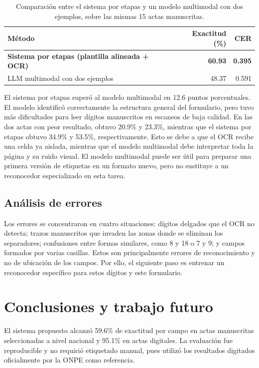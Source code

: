 \documentclass[conference]{IEEEtran}
\begin{document}
\begin{table}[t]
\caption{Comparaci\'on entre el sistema por etapas y un modelo multimodal con
dos ejemplos, sobre las mismas 15 actas manuscritas.}
\label{tab:llm}
\centering
\begin{tabular}{lrr}
\toprule
M\'etodo & Exactitud (\%) & CER \\
\midrule
\textbf{Sistema por etapas (plantilla alineada + OCR)} & \textbf{60.93} & \textbf{0.395} \\
LLM multimodal con dos ejemplos & 48.37 & 0.591 \\
\bottomrule
\end{tabular}
\end{table}

El sistema por etapas super\'o al modelo multimodal en 12.6 puntos porcentuales.
El modelo identific\'o correctamente la estructura general del formulario, pero
tuvo m\'as dificultades para leer d\'igitos manuscritos en escaneos de baja
calidad. En las dos actas con peor resultado, obtuvo 20.9\% y 23.3\%, mientras
que el sistema por etapas obtuvo 34.9\% y 53.5\%, respectivamente. Esto se debe
a que el OCR recibe una celda ya aislada, mientras que el modelo multimodal
debe interpretar toda la p\'agina y su ruido visual. El modelo multimodal puede
ser \'util para preparar una primera versi\'on de etiquetas en un formato nuevo,
pero no sustituye a un reconocedor especializado en esta tarea.

\subsection{An\'alisis de errores}
Los errores se concentraron en cuatro situaciones: d\'igitos delgados que el
OCR no detecta; trazos manuscritos que invaden las zonas donde se eliminan los
separadores; confusiones entre formas similares, como 8 y 18 o 7 y 9; y campos
formados por varias casillas. Estos son principalmente errores de
reconocimiento y no de ubicaci\'on de los campos. Por ello, el siguiente paso
es entrenar un reconocedor espec\'ifico para estos d\'igitos y este formulario.

\section{Conclusiones y trabajo futuro}
El sistema propuesto alcanz\'o 59.6\% de exactitud por campo en actas
manuscritas seleccionadas a nivel nacional y 95.1\% en actas digitales. La
evaluaci\'on fue reproducible y no requiri\'o etiquetado manual, pues utiliz\'o
los resultados digitados oficialmente por la ONPE como referencia.
\end{document}
